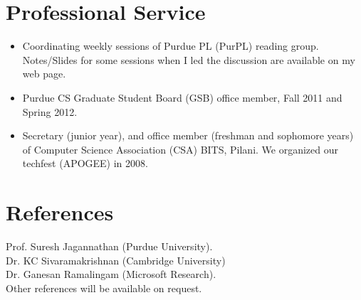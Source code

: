 \documentclass[margin,line]{res}
\begin{document}
\begin{resume}
\section {Professional Service}
\begin{itemize}
\item Coordinating weekly sessions of Purdue PL (PurPL) reading group.
Notes/Slides for some sessions when I led the discussion are available
on my web page.
\item Purdue CS Graduate Student Board (GSB) office member, Fall 2011 and
Spring 2012.
\item Secretary (junior year), and office member (freshman and sophomore
years) of Computer Science Association (CSA) BITS, Pilani. We
organized our techfest (APOGEE) in 2008. 
\end{itemize}

\section{References}
Prof. Suresh Jagannathan (Purdue University).\\
Dr. KC Sivaramakrishnan (Cambridge University)\\
Dr. Ganesan Ramalingam (Microsoft Research). \\
Other references will be available on request.
\end{resume} 
\end{document}
